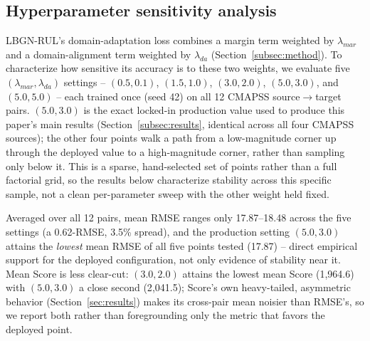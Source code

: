 
\subsection{Hyperparameter sensitivity analysis}
\label{subsec:sensitivity}

LBGN-RUL's domain-adaptation loss combines a margin term weighted by
$\lambda_{mar}$ and a domain-alignment term weighted by $\lambda_{da}$
(Section~\ref{subsec:method}). To characterize how sensitive its accuracy is
to these two weights, we evaluate five $(\lambda_{mar}, \lambda_{da})$
settings -- $(0.5, 0.1)$, $(1.5, 1.0)$, $(3.0, 2.0)$, $(5.0, 3.0)$, and
$(5.0, 5.0)$ -- each trained once (seed 42) on all 12 CMAPSS source$\to$target
pairs. $(5.0, 3.0)$ is the exact locked-in production value used to produce
this paper's main results (Section~\ref{subsec:results}, identical across all
four CMAPSS sources); the other four points walk a path from a low-magnitude
corner up through the deployed value to a high-magnitude corner, rather than
sampling only below it. This is a sparse, hand-selected set of points rather
than a full factorial grid, so the results below characterize stability
across this specific sample, not a clean per-parameter sweep with the other
weight held fixed.

Averaged over all 12 pairs, mean RMSE ranges only 17.87--18.48 across the
five settings (a 0.62-RMSE, 3.5\% spread), and the production setting
$(5.0, 3.0)$ attains the \emph{lowest} mean RMSE of all five points tested
(17.87) -- direct empirical support for the deployed configuration, not only
evidence of stability near it. Mean Score is less clear-cut: $(3.0, 2.0)$
attains the lowest mean Score (1{,}964.6) with $(5.0, 3.0)$ a close second
(2{,}041.5); Score's own heavy-tailed, asymmetric behavior (Section~\ref{sec:results})
makes its cross-pair mean noisier than RMSE's, so we report both rather than
foregrounding only the metric that favors the deployed point.

